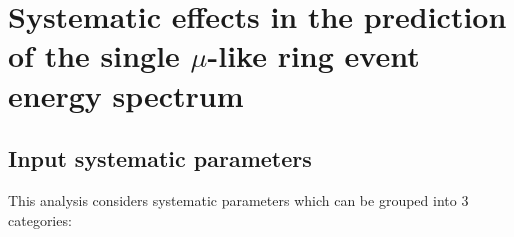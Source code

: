 \clearpage

\section {Systematic effects in the prediction of the single $\mu$-like ring event energy spectrum}
\label{sec:systematics}


\subsection {Input systematic parameters}

\label{sec:systematics:inputs}

This analysis considers \NSyst{} systematic parameters which can be grouped into 3 categories:

